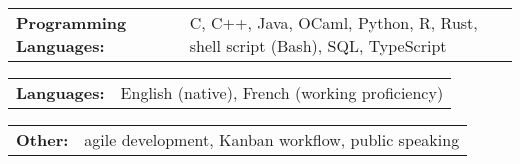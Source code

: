 \documentclass[10pt]{article}
\begin{document}
		\vspace{5pt}
		\noindent
		\begin{tabular}{@{}l@{\ }l}
		\textbf{Programming Languages: } & C, C++, Java, OCaml, Python, R, Rust, shell script (Bash), SQL, TypeScript\\
		\end{tabular}
		
		\vspace{5pt}
		\noindent
		\begin{tabular}{@{}l@{\ }l}
		\textbf{Languages: } & English (native), French (working proficiency) \\
		\end{tabular}
		
		\vspace{5pt}
		\noindent
		\begin{tabular}{@{}l@{\ }l}
		\textbf{Other: } &  agile development, Kanban workflow, public speaking \\
		\end{tabular}
			
\end{document}
